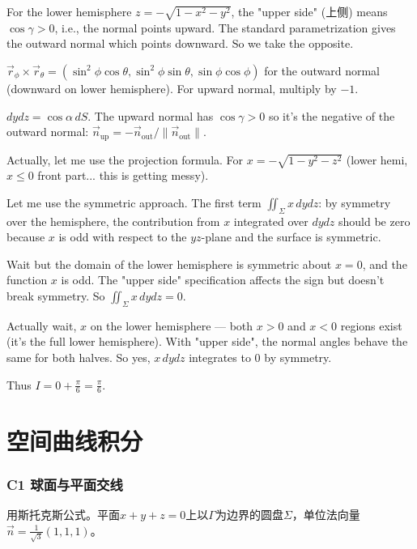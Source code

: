 \documentclass[12pt,a4paper]{ctexart}
\newcommand{\answerbox}[1]{\begin{center}\fbox{\color{red}\large\bfseries #1}\end{center}}
\begin{document}
For the lower hemisphere $z=-\sqrt{1-x^2-y^2}$, the "upper side" (上侧) means $\cos\gamma > 0$, i.e., the normal points upward. The standard parametrization gives the outward normal which points downward. So we take the opposite.

$\vec r_\phi\times\vec r_\theta = (\sin^2\phi\cos\theta,\sin^2\phi\sin\theta,\sin\phi\cos\phi)$ for the outward normal (downward on lower hemisphere).
For upward normal, multiply by $-1$.

$dydz = \cos\alpha\,dS$. The upward normal has $\cos\gamma > 0$ so it's the negative of the outward normal: $\vec n_{\text{up}} = -\vec n_{\text{out}}/\|\vec n_{\text{out}}\|$.

Actually, let me use the projection formula. For $x = -\sqrt{1-y^2-z^2}$ (lower hemi, $x\le 0$ front part... this is getting messy).

Let me use the symmetric approach. The first term $\iint_\Sigma x\,dydz$: by symmetry over the hemisphere, the contribution from $x$ integrated over $dydz$ should be zero because $x$ is odd with respect to the $yz$-plane and the surface is symmetric.

Wait but the domain of the lower hemisphere is symmetric about $x=0$, and the function $x$ is odd. The "upper side" specification affects the sign but doesn't break symmetry. So $\iint_\Sigma x\,dydz = 0$.

Actually wait, $x$ on the lower hemisphere — both $x>0$ and $x<0$ regions exist (it's the full lower hemisphere). With "upper side", the normal angles behave the same for both halves. So yes, $x\,dydz$ integrates to 0 by symmetry.

Thus $I = 0 + \frac\pi6 = \frac\pi6$.
\answerbox{$\frac\pi6$}

\newpage
\part*{空间曲线积分}

\section{C1 球面与平面交线}


用斯托克斯公式。平面$x+y+z=0$上以$\Gamma$为边界的圆盘$\Sigma$，单位法向量$\vec n=\frac1{\sqrt3}(1,1,1)$。
\end{document}
